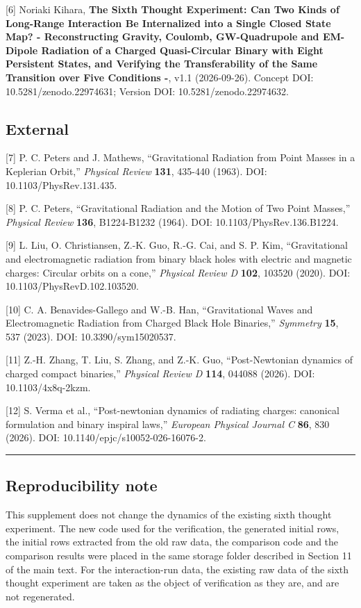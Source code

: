 \documentclass[
  a4paper,
]{article}
\begin{document}
{[}6{]} Noriaki Kihara, \textbf{The Sixth Thought Experiment: Can Two
Kinds of Long-Range Interaction Be Internalized into a Single Closed
State Map? - Reconstructing Gravity, Coulomb, GW-Quadrupole and
EM-Dipole Radiation of a Charged Quasi-Circular Binary with Eight
Persistent States, and Verifying the Transferability of the Same
Transition over Five Conditions -}, v1.1 (2026-09-26). Concept DOI:
10.5281/zenodo.22974631; Version DOI: 10.5281/zenodo.22974632.

\subsection{External}\label{external}

{[}7{]} P. C. Peters and J. Mathews, ``Gravitational Radiation from
Point Masses in a Keplerian Orbit,'' \emph{Physical Review}
\textbf{131}, 435-440 (1963). DOI: 10.1103/PhysRev.131.435.

{[}8{]} P. C. Peters, ``Gravitational Radiation and the Motion of Two
Point Masses,'' \emph{Physical Review} \textbf{136}, B1224-B1232 (1964).
DOI: 10.1103/PhysRev.136.B1224.

{[}9{]} L. Liu, O. Christiansen, Z.-K. Guo, R.-G. Cai, and S. P. Kim,
``Gravitational and electromagnetic radiation from binary black holes
with electric and magnetic charges: Circular orbits on a cone,''
\emph{Physical Review D} \textbf{102}, 103520 (2020). DOI:
10.1103/PhysRevD.102.103520.

{[}10{]} C. A. Benavides-Gallego and W.-B. Han, ``Gravitational Waves
and Electromagnetic Radiation from Charged Black Hole Binaries,''
\emph{Symmetry} \textbf{15}, 537 (2023). DOI: 10.3390/sym15020537.

{[}11{]} Z.-H. Zhang, T. Liu, S. Zhang, and Z.-K. Guo, ``Post-Newtonian
dynamics of charged compact binaries,'' \emph{Physical Review D}
\textbf{114}, 044088 (2026). DOI: 10.1103/4x8q-2kzm.

{[}12{]} S. Verma et al., ``Post-newtonian dynamics of radiating
charges: canonical formulation and binary inspiral laws,''
\emph{European Physical Journal C} \textbf{86}, 830 (2026). DOI:
10.1140/epjc/s10052-026-16076-2.

\begin{center}\rule{0.5\linewidth}{0.5pt}\end{center}

\subsection{Reproducibility note}\label{reproducibility-note}

This supplement does not change the dynamics of the existing sixth
thought experiment. The new code used for the verification, the
generated initial rows, the initial rows extracted from the old raw
data, the comparison code and the comparison results were placed in the
same storage folder described in Section 11 of the main text. For the
interaction-run data, the existing raw data of the sixth thought
experiment are taken as the object of verification as they are, and are
not regenerated.
\end{document}
